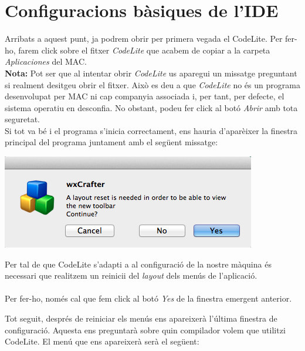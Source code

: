 \documentclass[11pt]{article}
\begin{document}
\newpage

\section{Configuracions bàsiques de l'IDE}
\noindent Arribats a aquest punt, ja podrem obrir per primera vegada el CodeLite. Per fer-ho, farem click sobre el fitxer \textit{CodeLite} que acabem de copiar a la carpeta \textit{Aplicaciones} del MAC.\\

\noindent \textbf{Nota:} Pot ser que al intentar obrir \textit{CodeLite} us aparegui un missatge preguntant si realment desitgeu obrir el fitxer. Això es deu a que \textit{CodeLite} no és un programa desenvolupat per MAC ni cap companyia associada i, per tant, per defecte, el sistema operatiu en desconfia. No obstant, podeu fer click al botó \textit{Abrir} amb tota seguretat.\\

\noindent Si tot va bé i el programa s'inicia correctament, ens hauria d'aparèixer la finestra principal del programa juntament amb el següent missatge:

\begin{center}
	\includegraphics[scale=0.5]{img/Layout_Reset.png}
\end{center}

\noindent Per tal de que CodeLite s'adapti a al configuració de la nostre màquina és necessari que realitzem un reinicii del \textit{layout} dels menús de l'aplicació.\\\\
Per fer-ho, només cal que fem click al botó \textit{Yes} de la finestra emergent anterior.

\newpage

\noindent Tot seguit, després de reiniciar els menús ens apareixerà l'última finestra de configuració. Aquesta ens preguntarà sobre quin compilador volem que utilitzi CodeLite. El menú que ens apareixerà serà el següent:
\end{document}

